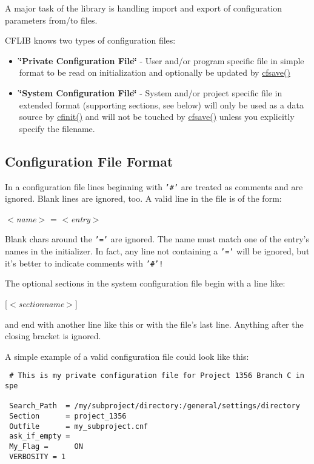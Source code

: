 A major task of the library is handling import and export of configuration parameters from/to files.

CFLIB knows two types of configuration files:

\begin{itemize}
\item {\bf \char`\"{}Private Configuration File\char`\"{}} - User and/or program specific file in simple format to be read on initialization and optionally be updated by \hyperlink{group__setting__saving_g046d8a68eae35b987eacca04a9a06cca}{cfsave()}\end{itemize}


\begin{itemize}
\item {\bf \char`\"{}System Configuration File\char`\"{}} - System and/or project specific file in extended format (supporting sections, see below) will only be used as a data source by \hyperlink{group__cflib__core_ge593ff607f853bd5fc16a16bb6759314}{cfinit()} and will not be touched by \hyperlink{group__setting__saving_g046d8a68eae35b987eacca04a9a06cca}{cfsave()} unless you explicitly specify the filename.\end{itemize}
\hypertarget{config_files_config_format}{}\subsection{Configuration File Format}\label{config_files_config_format}
In a configuration file lines beginning with {\tt '\#'} are treated as comments and are ignored. Blank lines are ignored, too. A valid line in the file is of the form:

$<${\em name$>$\/} = $<${\em entry$>$\/} 

Blank chars around the {\tt '='} are ignored. The name must match one of the entry's names in the initializer. In fact, any line not containing a {\tt '='} will be ignored, but it's better to indicate comments with {\tt '\#'!} 

The optional sections in the system configuration file begin with a line like:

\mbox{[}$<${\em sectionname$>$\/}\mbox{]}

and end with another line like this or with the file's last line. Anything after the closing bracket is ignored.

A simple example of a valid configuration file could look like this: 

\begin{Code}\begin{verbatim} # This is my private configuration file for Project 1356 Branch C in spe

 Search_Path  = /my/subproject/directory:/general/settings/directory
 Section      = project_1356
 Outfile      = my_subproject.cnf
 ask_if_empty =
 My_Flag =      ON
 VERBOSITY = 1
\end{verbatim}
\end{Code}



